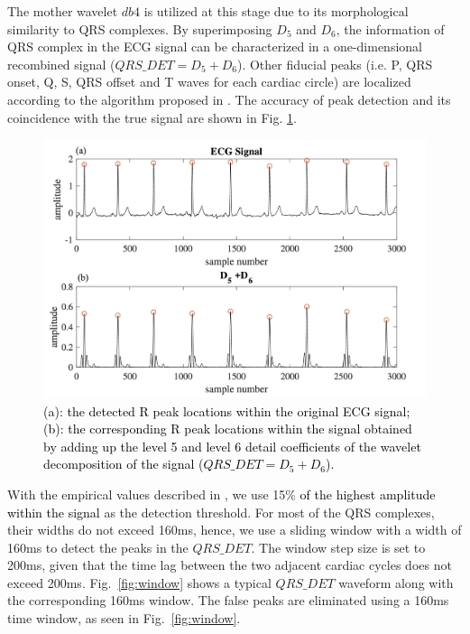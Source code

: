 The mother wavelet $db4$ is utilized at this stage due to its morphological similarity to QRS complexes\cite{martinez2004wavelet}. By superimposing $D_5$ and $D_6$, the information of QRS complex in the ECG signal can be characterized in a one-dimensional recombined signal ($QRS\_DET = D_5+D_6$). Other fiducial peaks (i.e. P, QRS onset, Q, S, QRS offset and T waves for each cardiac circle) are localized according to the algorithm proposed in \cite{2012qrs}. The accuracy of peak detection and its coincidence with the true signal are shown in Fig. \ref{fig:QRS_d5d6}.

\begin{figure}[t]
\centering
\includegraphics[scale=.5]{Fig/QRS_D5D6_sub.png}
\caption{\textcolor{black}{(a): the detected R peak locations within the original ECG signal; (b): the corresponding R peak locations within the signal obtained by adding up the level 5 and level 6 detail coefficients of the wavelet decomposition of the signal ($QRS\_DET = D_5+D_6$).} }
\label{fig:QRS_d5d6}
\end{figure}


With the empirical values described in \cite{2012qrs}, we use 15\% \textcolor{black}{of the highest amplitude within the signal} as the detection threshold. For most of the QRS complexes, their widths do not exceed 160ms, hence, we use a sliding window with a width of 160ms to detect the peaks in the $QRS\_DET$. The window step size is set to 200ms, given that the time lag between the two adjacent cardiac cycles does not exceed 200ms\cite{banerjee2012delineation}.  Fig.~\ref{fig:window} shows a typical $QRS\_DET$ waveform along with the corresponding 160ms window. The false peaks are eliminated using a 160ms time window, as seen in Fig.~\ref{fig:window}.


